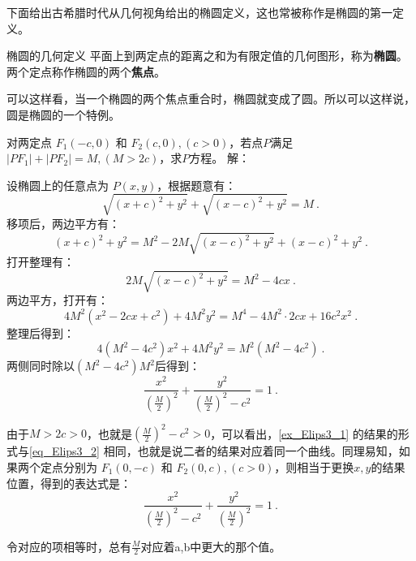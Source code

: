 下面给出古希腊时代从几何视角给出的椭圆定义，这也常被称作是椭圆的第一定义。

\begin{definition}{椭圆的几何定义}
平面上到两定点的距离之和为有限定值的几何图形，称为\textbf{椭圆}。两个定点称作椭圆的两个\textbf{焦点}。
\end{definition}

可以这样看，当一个椭圆的两个焦点重合时，椭圆就变成了圆。所以可以这样说，圆是椭圆的一个特例。


\begin{example}{对两定点 $F_1(-c, 0)$ 和 $F_2(c, 0),(c>0)$，若点$P$满足$|PF_1| + |PF_2| = M,(M > 2c)$，求$P$方程。}\label{ex_Elips3_1}
解：

设椭圆上的任意点为 $P(x, y)$，根据题意有：
\begin{equation}
\sqrt{(x + c)^2 + y^2} + \sqrt{(x - c)^2 + y^2} = M~.
\end{equation}
移项后，两边平方有：
\begin{equation}
(x + c)^2 + y^2 = M^2 - 2M\sqrt{(x - c)^2 + y^2} + (x - c)^2 + y^2~.
\end{equation}
打开整理有：
\begin{equation}
2M\sqrt{(x - c)^2 + y^2}= M^2 - 4cx~.
\end{equation}
两边平方，打开有：
\begin{equation}
4M^2(x^2 - 2cx+c^2) + 4M^2y^2= M^4-4M^2\cdot2cx+16c^2x^2~.
\end{equation}
整理后得到：
\begin{equation}
4(M^2 -4c^2)x^2 + 4M^2y^2= M^2(M^2-4c^2)~.
\end{equation}
两侧同时除以$(M^2-4c^2)M^2$后得到：
\begin{equation}
\frac{x^2}{\left(\displaystyle\frac{M}{2}\right)^2} + \frac{y^2}{\displaystyle\left(\frac{M}{2}\right)^2-c^2}=1~.
\end{equation}
\end{example}

由于$M>2c>0$，也就是$\displaystyle\left(\frac{M}{2}\right)^2-c^2>0$，可以看出，\autoref{ex_Elips3_1} 的结果的形式与\autoref{eq_Elips3_2} 相同，也就是说二者的结果对应着同一个曲线。同理易知，如果两个定点分别为 $F_1(0,-c)$ 和 $F_2(0,c),(c>0)$，则相当于更换$x,y$的结果位置，得到的表达式是：
\begin{equation}
\frac{x^2}{\displaystyle\left(\frac{M}{2}\right)^2-c^2}+\frac{y^2}{\left(\displaystyle\frac{M}{2}\right)^2} =1~.
\end{equation}

令对应的项相等时，总有$\displaystyle\frac{M}{2}$对应着a,b中更大的那个值。

